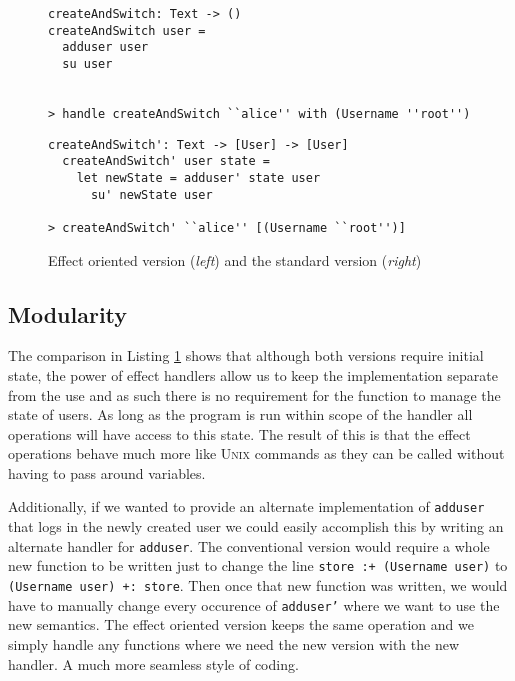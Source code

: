 \documentclass[logo,bsc,singlespacing,parskip]{infthesis}
\begin{document}
\begin{figure}[h]
  \label{fig:seqvshandler}
\begin{minipage}{0.5\textwidth}

\begin{lstlisting}[style=terminal]
createAndSwitch: Text -> ()
createAndSwitch user =
  adduser user
  su user


> handle createAndSwitch ``alice'' with (Username ''root'')

\end{lstlisting}

\end{minipage}%
\begin{minipage}{0.5\textwidth}


\begin{lstlisting}[style=terminal]
  createAndSwitch': Text -> [User] -> [User]
  createAndSwitch' user state =
    let newState = adduser' state user
      su' newState user

> createAndSwitch' ``alice'' [(Username ``root'')]

\end{lstlisting}
\end{minipage}
\caption{Effect oriented version (\emph{left}) and the standard version (\emph{right})}
\end{figure}

\subsection{Modularity}

The comparison in Listing \ref{fig:seqvshandler} shows that although both versions require initial state,
the power of effect handlers allow us to keep the implementation separate from
the use and as such there is no requirement for the function to manage the state of
users. As long as the program is run within scope of the handler all operations
will have access to this state. The result of this is that the effect operations
behave much more like \textsc{Unix} commands as they can be called without
having to pass around variables.

Additionally, if we wanted to provide an alternate implementation of
\texttt{adduser} that logs in the newly created user we could easily accomplish
this by writing an alternate handler for \texttt{adduser}. The conventional
version would require a whole new function to be written just to change the line
\texttt{store :+ (Username user)} to \texttt{(Username user) +: store}. Then
once that new function was written, we would have to manually change every
occurence of \texttt{adduser'} where we want to use the new semantics. The
effect oriented version keeps the same operation and we simply handle any
functions where we need the new version with the new handler. A much more
seamless style of coding.
\end{document}
